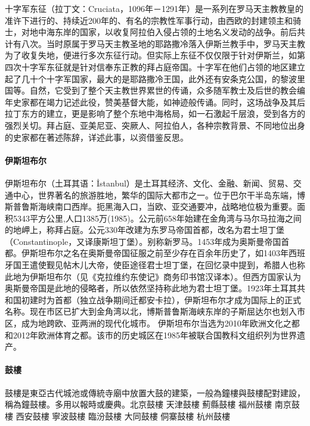 \documentclass[letter]{book}
\begin{document}
十字军东征（拉丁文：Cruciata，1096年－1291年）是一系列在罗马天主教教皇的准许下进行的、持续近200年的、有名的宗教性军事行动，由西欧的封建领主和骑士，对地中海东岸的国家，以收复阿拉伯入侵占领的土地名义发动的战争。前后共计有八次。当时原属于罗马天主教圣地的耶路撒冷落入伊斯兰教手中，罗马天主教为了收复失地，便进行多次东征行动。但实际上东征不仅仅限于针对伊斯兰，如第四次十字军东征就是针对信奉东正教的拜占庭帝国。十字军在他们占领的地区建立起了几十个十字军国家，最大的是耶路撒冷王国，此外还有安条克公国，的黎波里国等。自然，它受到了整个天主教世界累世的传诵，众多随军教士及后世的教会编年史家都在竭力记述此役，赞美基督大能，如神迹般传诵。同时，这场战争及其后拉丁东方的建立，更是影响了整个东地中海格局，如一石激起千层浪，受到各方的强烈关切。拜占庭、亚美尼亚、突厥人、阿拉伯人，各种宗教背景、不同地位出身的史家都在著述陈辞，详述此事，以资借鉴反思。

\paragraph{伊斯坦布尔}

伊斯坦布尔（土耳其语：İstanbul）是土耳其经济、文化、金融、新闻、贸易、交通中心，世界著名的旅游胜地，繁华的国际大都市之一。位于巴尔干半岛东端，博斯普鲁斯海峡南口西岸。扼黑海入口，当欧、亚交通要冲，战略地位极为重要。面积5343平方公里,人口1385万(1985)。公元前658年始建在金角湾与马尔马拉海之间的地岬上，称拜占庭。公元330年改建为东罗马帝国首都，改名为君士坦丁堡（Constantinople，又译康斯坦丁堡）。别称新罗马。1453年成为奥斯曼帝国首都。伊斯坦布尔之名在奥斯曼帝国征服之前至少存在百余年历史了，如1403年西班牙国王遣使觐见帖木儿大帝，使臣途径君士坦丁堡，在回忆录中提到，希腊人也称此地为伊斯坦布尔（见《克拉维约东使记》商务印书馆汉译本）。但西方国家认为奥斯曼帝国是此地的侵略者，所以依然坚持称此地为君士坦丁堡。1923年土耳其共和国初建时为首都（独立战争期间迁都安卡拉），伊斯坦布尔才成为国际上的正式名称。现在市区已扩大到金角湾以北，博斯普鲁斯海峡东岸的子斯屈达尔也划入市区，成为地跨欧、亚两洲的现代化城市。
伊斯坦布尔当选为2010年欧洲文化之都和2012年欧洲体育之都。该市的历史城区在1985年被联合国教科文组织列为世界遗产。

\paragraph{鼓樓}

鼓樓是東亞古代城池或傳統寺廟中放置大鼓的建築，一般為鐘樓與鼓樓配對建設，稱為鐘鼓樓。多用以報時或慶典。北京鼓樓
天津鼓樓
薊縣鼓樓
福州鼓樓
南京鼓樓
西安鼓樓
寧波鼓樓
臨汾鼓樓
大同鼓樓
侗寨鼓樓
杭州鼓樓
\end{document}
